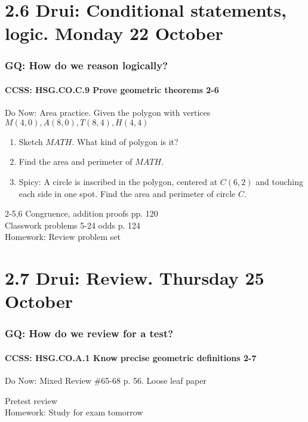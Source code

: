 \documentclass{beamer}
\begin{document}
\section{2.6 Drui: Conditional statements, logic. Monday 22 October}
  \frame
  {
    \frametitle{GQ: How do we reason logically?}
    \framesubtitle{CCSS: HSG.CO.C.9 Prove geometric theorems  \alert{2-6}}

    \begin{block}{Do Now: Area practice. Given the polygon with vertices $M(4,0), A(8,0), T(8,4), H(4,4)$}
    \begin{enumerate}
        \item Sketch $MATH$. What kind of polygon is it?
        \item Find the area and perimeter of $MATH$.
        \item Spicy: A circle is inscribed in the polygon, centered at $C(6,2)$ and touching each side in one spot. Find the area and perimeter of circle $C$.
    \end{enumerate}
    \end{block}
    2-5,6 Congruence, addition proofs  pp. 120\\
    Classwork problems 5-24 odds p. 124\\
    \vspace{0.5cm}
    Homework: Review problem set
  }

\section{2.7 Drui: Review. Thursday 25 October}
  \frame
  {
  \frametitle{GQ: How do we review for a test?}
  \framesubtitle{CCSS: HSG.CO.A.1 Know precise geometric definitions  \alert{2-7}}

  \begin{block}{Do Now: Mixed Review \#65-68 p. 56. Loose leaf paper}
  \end{block}
  Pretest review\\
  \vspace{0.5cm}
  Homework: Study for \alert{exam tomorrow}
}
\end{document}
